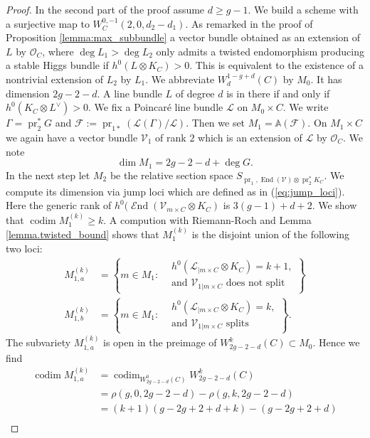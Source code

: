 \documentclass[12pt]{extarticle}
\theoremstyle{definition}
\numberwithin{theorem}{section}
\newcommand{\Aff}{\mathbb{A}}
\newcommand{\OO}{\mathcal{O}}
\newcommand{\cL}{\mathcal{L}}
\newcommand{\cV}{\mathcal{V}}
\newcommand{\cF}{\mathcal{F}}
\newcommand{\op}{\operatorname}
\DeclareMathOperator{\End}{\mathcal{E}nd}
\begin{document}
\begin{proof}
In the second part of the proof assume $d \geq g-1$. We build a scheme with a surjective map to $W_C^{0,-1}(2,0,d_2-d_1)$. As remarked in the proof of Proposition \ref{lemma:max_subbundle} a vector bundle obtained as an extension of $L$ by $\OO_C$, where $\deg L_1 > \deg L_2$ only admits a twisted endomorphism producing a stable Higgs bundle if $h^0(L\otimes K_C) > 0$. This is equivalent to the existence of a nontrivial extension of $L_2$ by $L_1$. We abbreviate $W^{1-g+d}_{d}(C)$ by $M_0$. It has dimension $2g-2-d$. A line bundle $L$ of degree $d$ is in there if and only if $h^0(K_C\otimes L^\vee) > 0$. We fix a Poincaré line bundle $\cL$ on $M_0 \times C$. 
We write $\Gamma = \op{pr}_{2}^*G$ and $\cF := \op{pr}_{1*}\left(\cL(\Gamma)/\cL\right)$. Then we set $M_1 = \Aff(\cF)$. On $M_1 \times C$ we again have a vector bundle $\cV_1$ of rank $2$ which is an extension of $\cL$ by $\OO_C$. We note
\begin{equation*}
\dim M_1 = 2g-2 -d + \deg G.
\end{equation*}
In the next step let $M_2$ be the relative section space $ S_{\op{pr}_1,\op{End}(\cV)\otimes \op{pr}_2^*K_C}$. We compute its dimension via jump loci which are defined as in (\ref{eq:jump_loci}). Here the generic rank of $h^0(\End(\cV_{m\times C}\otimes K_C)$ is $3(g-1)+d+2$. We show that $\op{codim} M_1^{(k)} \geq k$.
A compution with Riemann-Roch and Lemma \ref{lemma.twisted_bound} shows that $M^{(k)}_1$ is the disjoint union of the following two loci:
\begin{align*}
M_{1,a}^{(k)} &= \left\{m \in M_1: \begin{aligned}
&h^0(\cL_{|m\times C}\otimes K_C) = k+1,\\ 
&\text{and $\cV_{1|m\times C}$ does not split}
\end{aligned} \right\} \\
M_{1,b}^{(k)} &= \left\{m \in M_1: 
\begin{aligned}
&h^0(\cL_{|m\times C}\otimes K_C) = k,\\ 
&\text{and $\cV_{1|m\times C}$ splits}
\end{aligned}
\right\}.
\end{align*}
The subvariety $M_{1,a}^{(k)}$ is open in the preimage of $W^k_{2g-2-d}(C) \subset M_0$. Hence we find
\begin{align*}
\op{codim} M^{(k)}_{1,a} &= \op{codim}_{W^0_{2g-2-d}(C)}W^k_{2g-2-d}(C) \\
&= \rho(g,0,2g-2-d) - \rho(g,k,2g-2-d) \\
&= (k+1)(g-2g+2+d+k) - (g-2g+2+d)\\

\end{align*}
\end{proof}
\end{document}
